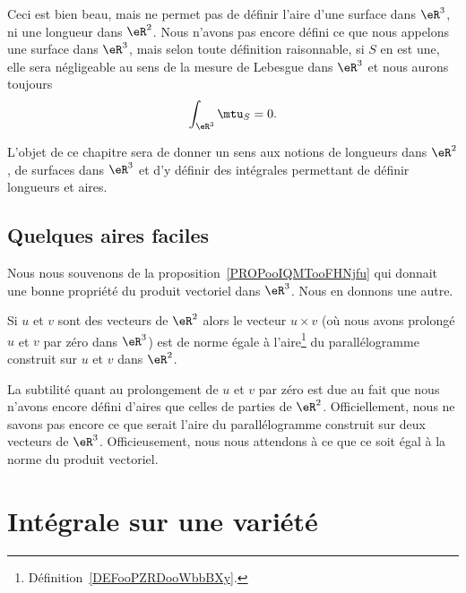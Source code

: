 Ceci est bien beau, mais ne permet pas de définir l'aire d'une surface dans \( \eR^3\), ni une longueur dans \( \eR^2\). Nous n'avons pas encore défini ce que nous appelons une surface dans \( \eR^3\), mais selon toute définition raisonnable, si \( S\) en est une, elle sera négligeable au sens de la mesure de Lebesgue dans \( \eR^3\) et nous aurons toujours
\begin{equation}
    \int_{\eR^3}\mtu_S=0.
\end{equation}

L'objet de ce chapitre sera de donner un sens aux notions de longueurs dans \( \eR^2\), de surfaces dans \( \eR^3\) et d'y définir des intégrales permettant de définir longueurs et aires.

\subsection{Quelques aires faciles}

Nous nous souvenons de la proposition~\ref{PROPooIQMTooFHNjfu} qui donnait une bonne propriété du produit vectoriel dans \( \eR^3\). Nous en donnons une autre.

\begin{proposition}
    Si \( u\) et \( v\) sont des vecteurs de \( \eR^2\) alors le vecteur \( u\times v\) (où nous avons prolongé \( u\) et \( v\) par zéro dans \( \eR^3\)) est de norme égale à l'aire\footnote{Définition~\ref{DEFooPZRDooWbbBXy}.} du parallélogramme construit sur \( u\) et \( v\) dans \( \eR^2\).
\end{proposition}

La subtilité quant au prolongement de \( u\) et \( v\) par zéro est due au fait que nous n'avons encore défini d'aires que celles de parties de \( \eR^2\). Officiellement, nous ne savons pas encore ce que serait l'aire du parallélogramme construit sur deux vecteurs de \( \eR^3\). Officieusement, nous nous attendons à ce que ce soit égal à la norme du produit vectoriel.

\section{Intégrale sur une variété}

